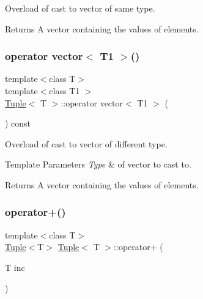 Overload of cast to vector of same type. 

\begin{DoxyReturn}{Returns}
A vector containing the values of elements. 
\end{DoxyReturn}
\mbox{\label{class_tuple_a924a25df1578ffab148c69a1a1000491}} 
\subsubsection{\texorpdfstring{operator vector$<$ T1 $>$()}{operator vector< T1 >()}}
{\footnotesize\ttfamily template$<$class T$>$ \\
template$<$class T1 $>$ \\
\mbox{\hyperlink{class_tuple}{Tuple}}$<$ T $>$\+::operator vector$<$ T1 $>$ (\begin{DoxyParamCaption}{ }\end{DoxyParamCaption}) const\hspace{0.3cm}{\ttfamily [inline]}}



Overload of cast to vector of different type. 


\begin{DoxyTemplParams}{Template Parameters}
{\em Type} & of vector to cast to. \\
\hline
\end{DoxyTemplParams}
\begin{DoxyReturn}{Returns}
A vector containing the values of elements. 
\end{DoxyReturn}
\mbox{\label{class_tuple_af41b573429ba5d8fc0b5576b7b41e818}} 
\subsubsection{\texorpdfstring{operator+()}{operator+()}}
{\footnotesize\ttfamily template$<$class T$>$ \\
\mbox{\hyperlink{class_tuple}{Tuple}}$<$T$>$ \mbox{\hyperlink{class_tuple}{Tuple}}$<$ T $>$\+::operator+ (\begin{DoxyParamCaption}\item[{T}]{inc }\end{DoxyParamCaption})\hspace{0.3cm}{\ttfamily [inline]}}

